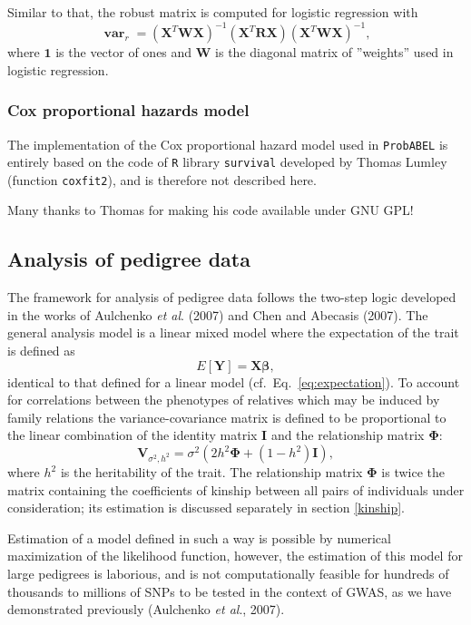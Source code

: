 \documentclass[12pt,a4paper]{article}
\DeclareMathOperator{\var}{\mathbf{var}}
\newcommand{\PA}{\texttt{ProbABEL}}
\begin{document}
Similar to that, the robust matrix is computed for logistic regression with
$$
\var_r = (\mathbf{X}^T \mathbf{W} \mathbf{X})^{-1} (\mathbf{X}^T\mathbf{R}\mathbf{X})
(\mathbf{X}^T \mathbf{W} \mathbf{X})^{-1},
$$
where $\mathbf{1}$ is the vector of ones and $\mathbf{W}$ is the diagonal matrix
of ''weights'' used in logistic regression.


\subsubsection{Cox proportional hazards model}
The implementation of the Cox proportional hazard model used
in \PA{} is entirely based on the code of \texttt{R}
library \texttt{survival} developed by Thomas Lumley
(function \texttt{coxfit2}), and is therefore not described here.

Many thanks to Thomas for making his code available under GNU GPL!

\subsection{Analysis of pedigree data}
The framework for analysis of pedigree data follows the two-step logic
developed in the works of Aulchenko \emph{et al}. (2007) and Chen and
Abecasis (2007). The general analysis model is a linear mixed model
where the expectation of the trait is defined as
$$
E[\mathbf{Y}] = \mathbf{X} \mathbf{\beta},
$$
identical to that defined for a linear model
(cf.~Eq.~\ref{eq:expectation}). To account for correlations between
the phenotypes of relatives which may be induced by family relations
the variance-covariance matrix is defined to be proportional to the
linear combination of the identity matrix $\mathbf{I}$ and the
relationship matrix $\mathbf{\Phi}$:
$$
\mathbf{V}_{\sigma^2,h^2} = \sigma^2 \left( 2 h^2 \mathbf{\Phi} + (1-h^2)
\mathbf{I} \right),
$$
where $h^2$ is the heritability of the trait. The relationship matrix
$\mathbf{\Phi}$ is twice the matrix containing the coefficients of
kinship between all pairs of individuals under consideration; its
estimation is discussed separately in section \ref{kinship}.

Estimation of a model defined in such a way is possible by numerical
maximization of the likelihood function, however, the estimation of
this model for large pedigrees is laborious, and is not
computationally feasible for hundreds of thousands to millions of SNPs
to be tested in the context of GWAS, as we have demonstrated
previously (Aulchenko \emph{et al}., 2007).
\end{document}
